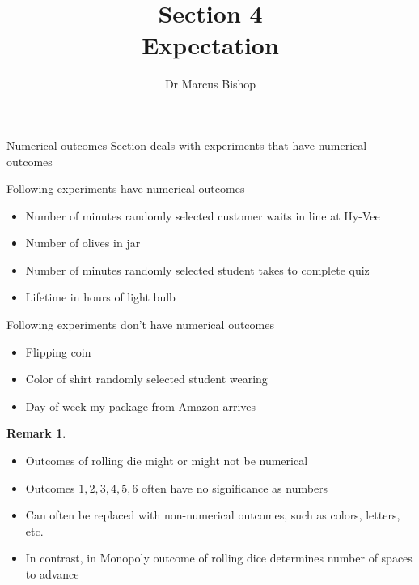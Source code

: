 \documentclass[handout]{beamer}
\title[\S4]{Section 4\\Expectation}
\author{Dr Marcus Bishop}
\theoremstyle{definition}
\newtheorem{remark}{Remark}
\begin{document}
\begin{frame}\titlepage\end{frame}
\LogoOff

\begin{frame}{Numerical outcomes}
Section deals with experiments
that have \alert{numerical outcomes}
\begin{example}
Following experiments have numerical outcomes
\begin{itemize}
\item Number of minutes randomly selected
customer waits in line at Hy-Vee
\item Number of olives in jar
\item Number of minutes randomly selected
student takes to complete quiz
\item Lifetime in hours of light bulb
\end{itemize}
\end{example}
\end{frame}

\begin{frame}
\begin{example}
Following experiments \alert{don't} have numerical outcomes
\begin{itemize}
\item Flipping coin
\item Color of shirt randomly selected student wearing
\item Day of week my package from Amazon arrives
\end{itemize}
\end{example}
\begin{remark}
\begin{itemize}
\item Outcomes of rolling die might or might not be numerical
\item Outcomes $1,2,3,4,5,6$  often have no significance as numbers
\item Can often be replaced with non-numerical outcomes,
such as colors, letters, etc.
\item In contrast, in Monopoly outcome of rolling dice
determines \alert{number} of spaces to advance
\end{itemize}
\end{remark}
\end{frame}
\end{document}
